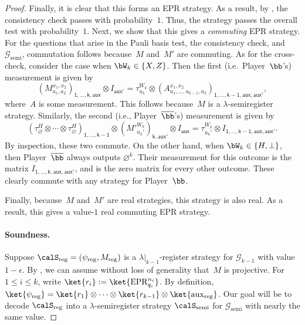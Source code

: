\documentclass[11pt]{article}
\newcommand{\shorten}[2]{#1|_{#2}}
\newcommand{\register}{\lambda}
\newcommand{\game}{\mathscr{G}}
\newcommand{\reg}[1]{{\mathsf{#1}}}
\begin{document}
\begin{proof}
Finally, it is clear that this forms an EPR strategy.
As a result, by ,
the consistency check passes with probability~$1$.
Thus, the strategy passes the overall test with probability~$1$.
Next, we show that this gives a \emph{commuting} EPR strategy.
For the questions that arise in the Pauli basis test, the consistency check, and~$\game_{\mathrm{semi}}$,
commutation follows because~$M$ and~$M'$ are commuting.
As for the cross-check, consider the case when $\bW_k \in \{X, Z\}$.
Then  the first (i.e.\ Player~$\bb$'s) measurement is given by
\begin{equation*}
(M^{x_1, x_2}_{a_1, a_2})_{\reg{1, \ldots, k, aux}} \otimes I_{\reg{aux'}}
= \tau^{W_k}_{u_k} \otimes (A^{x_1, x_2}_{u_1, \ldots, u_{k-1}, a_2})_{\reg{1, \ldots, k-1, aux, aux'}},
\end{equation*}
where~$A$ is some measurement.
This follows because~$M$ is a $\register$-semiregister strategy.
Similarly, the second (i.e., Player~$\overline{\bb}$'s) measurement is given by
\begin{equation*}
(\tau_{\varnothing}^H \otimes \cdots \otimes \tau^H_{\varnothing})_{\reg{1, \ldots, k-1}}
\otimes (M'^{W_k}_{u_k'})_{\reg{k, aux'}} \otimes I_{\reg{aux}}
= \tau^{W_k}_{u_k'} \otimes I_{\reg{1, \ldots, k-1, aux, aux'}}.
\end{equation*}
By inspection, these two commute.
On the other hand, when $\bW_k \in \{H, \bot\}$,
then Player~$\overline{\bb}$ always outputs $\varnothing^k$.
Their measurement for this outcome is the matrix $I_{\reg{1, \ldots, k, aux, aux'}}$,
and is the zero matrix for every other outcome.
These clearly commute with any strategy for Player~$\bb$.

Finally, because~$M$ and~$M'$ are real strategies,
this strategy is also real.
As a result, this gives a value-$1$ real commuting EPR strategy.

\paragraph{Soundness.}

Suppose $\calS_{\mathrm{reg}} = (\psi_{\mathrm{reg}}, M_{\mathrm{reg}})$ is a  $\shorten{\register}{k-1}$-register strategy for $\game_{k-1}$ with value $1-\epsilon$.
By , we can assume without loss of generality that~$M$ is projective.
For $1 \leq i \leq k$, write $\ket{r_i} := \ket{\mathrm{EPR}_{q_i}^{n_i}}$.
By definition, $\ket{\psi_{\mathrm{reg}}} = \ket{r_1} \otimes \cdots \otimes \ket{r_{k-1}} \otimes \ket{\mathrm{aux}_{\mathrm{reg}}}$.
Our goal will be to decode $\calS_{\mathrm{reg}}$ into a $\register$-semiregister strategy $\calS_{\mathrm{semi}}$ for $\game_{\mathrm{semi}}$ with nearly the same value.


\end{proof}
\end{document}
